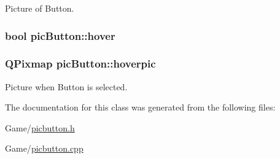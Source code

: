 Picture of Button. 

\subsubsection[{\texorpdfstring{hover}{hover}}]{\setlength{\rightskip}{0pt plus 5cm}bool pic\+Button\+::hover}\hypertarget{classpic_button_ab011ab567cb14054023cc46cfc3110c1}{}\label{classpic_button_ab011ab567cb14054023cc46cfc3110c1}
\subsubsection[{\texorpdfstring{hoverpic}{hoverpic}}]{\setlength{\rightskip}{0pt plus 5cm}Q\+Pixmap pic\+Button\+::hoverpic}\hypertarget{classpic_button_a6e387b9fc6348b681a786db8452fbc9d}{}\label{classpic_button_a6e387b9fc6348b681a786db8452fbc9d}


Picture when Button is selected. 



The documentation for this class was generated from the following files\+:\begin{DoxyCompactItemize}
\item 
Game/\hyperlink{picbutton_8h}{picbutton.\+h}\item 
Game/\hyperlink{picbutton_8cpp}{picbutton.\+cpp}\end{DoxyCompactItemize}
